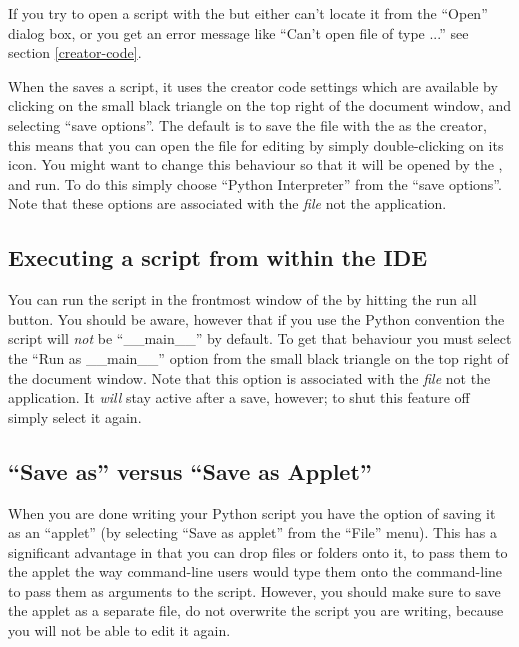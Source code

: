 If you try to open a script with the  but either
can't locate it from the ``Open'' dialog box, or you get an error
message like ``Can't open file of type ...'' see section
\ref{creator-code}.

When the  saves a script, it uses the creator code
settings which are available by clicking on the small black triangle
on the top right of the document window, and selecting ``save
options''. The default is to save the file with the  as the creator, this means that you can open the file for editing
by simply double-clicking on its icon. You might want to change this
behaviour so that it will be opened by the
, and run. To do this simply choose
``Python Interpreter'' from the ``save options''. Note that these
options are associated with the \emph{file} not the application.


\subsection{Executing a script from within the IDE
            \label{IDEexecution}}

You can run the script in the frontmost window of the  by hitting the run all button.  You should be aware, however that
if you use the Python convention  the
script will \emph{not} be ``__main__'' by default. To get that
behaviour you must select the ``Run as __main__'' option from the
small black triangle on the top right of the document window.  Note
that this option is associated with the \emph{file} not the
application. It \emph{will} stay active after a save, however; to shut
this feature off simply select it again.
 

\subsection{``Save as'' versus ``Save as Applet''
            \label{IDEapplet}}

When you are done writing your Python script you have the option of
saving it as an ``applet'' (by selecting ``Save as applet'' from the
``File'' menu). This has a significant advantage in that you can drop
files or folders onto it, to pass them to the applet the way
command-line users would type them onto the command-line to pass them
as arguments to the script. However, you should make sure to save the
applet as a separate file, do not overwrite the script you are
writing, because you will not be able to edit it again.

